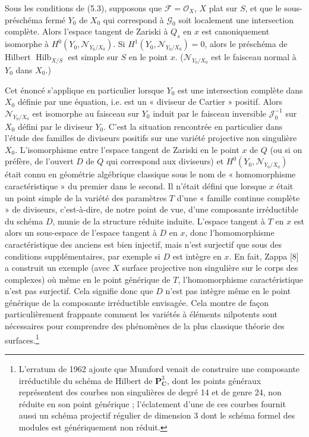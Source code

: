  Sous les conditions de (5.3), supposons que
$\mathcal F=\mathcal O_X$, $X$ plat sur $S$, et que le sous-préschéma fermé
$Y_0$ de $X_0$ qui correspond à $\mathcal G_0$ soit localement une intersection
complète. Alors l'espace tangent de Zariski à $Q_s$ en $x$ est canoniquement
isomorphe à $H^0(Y_0,\mathcal N_{Y_0/X_0})$. Si
$H^1(Y_0,\mathcal N_{Y_0/X_0})=0$, alors le préschéma de Hilbert
$\operatorname{Hilb}_{X/S}$ est simple sur $S$ en le point $x$.
($\mathcal N_{Y_0/X_0}$ est le faisceau normal à $Y_0$ dans $X_0$.)

 Cet énoncé s'applique en particulier lorsque $Y_0$ est
une intersection complète dans $X_0$ définie par une équation, i.e. est un
« diviseur de Cartier » positif. Alors $\mathcal N_{Y_0/X_0}$ est isomorphe au
faisceau sur $Y_0$ induit par le faisceau inversible $\mathcal J_0^{-1}$ sur
$X_0$ défini par le diviseur $Y_0$. C'est la situation rencontrée en particulier
dans l'étude des familles de diviseurs positifs sur une variété projective non
singulière $X_0$. L'isomorphisme entre l'espace tangent de Zariski en le point
$x$ de $Q$ (ou si on préfère, de l'ouvert $D$ de $Q$ qui correspond aux
diviseurs) et $H^0(Y_0,\mathcal N_{Y_0/X_0})$ était connu en géométrie
algébrique classique sous le nom de « homomorphisme caractéristique » du premier
dans le second. Il n'était défini que lorsque $x$ était un point simple de la
variété des paramètres $T$ d'une « famille continue complète » de diviseurs,
c'est-à-dire, de notre point de vue, d'une composante irréductible du schéma
$D$, munie de la structure réduite induite. L'espace tangent à $T$ en $x$ est alors
un sous-espace de l'espace tangent à $D$ en $x$, donc l'homomorphisme
caractéristique des anciens est bien injectif, mais n'est surjectif que sous des
conditions supplémentaires, par exemple si $D$ est intègre en $x$. En fait,
Zappa [8] a construit un exemple
(avec $X$ surface projective non singulière sur le corps des complexes) où même
en le point générique de $T$, l'homomorphisme caractéristique n'est pas
surjectif. Cela signifie donc que $D$ n'est pas intègre même en le point
générique de la composante irréductible envisagée. Cela montre de façon
particulièrement frappante comment les variétés à éléments nilpotents sont
nécessaires pour comprendre des phénomènes de la plus classique théorie des
surfaces.\footnote{L'erratum de 1962 ajoute que Mumford venait de construire
une composante irréductible du schéma de Hilbert de $\mathbf P^3_{\mathbf C}$,
dont les points généraux représentent des courbes non singulières de degré 14
et de genre 24, non réduite en son point générique ; l'éclatement d'une de ces
courbes fournit aussi un schéma projectif régulier de dimension 3 dont le
schéma formel des modules est génériquement non réduit.}

